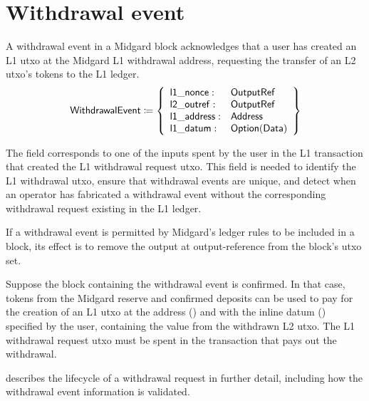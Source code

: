 \documentclass[../midgard.tex]{subfiles}
\begin{document}
\section{Withdrawal event}
\label{h:withdrawal-event}

A withdrawal event in a Midgard block acknowledges that a user has created an L1 utxo at the Midgard L1 withdrawal address, requesting the transfer of an L2 utxo's tokens to the L1 ledger.
\begin{equation*}
    \mathsf{WithdrawalEvent} \coloneq \left\{
    \begin{array}{ll}
        \mathsf{l1\_nonce} : & \mathsf{OutputRef} \\
        \mathsf{l2\_outref} :& \mathsf{OutputRef} \\
        \mathsf{l1\_address} : & \mathsf{Address} \\
        \mathsf{l1\_datum} : & \mathsf{Option(Data)}
    \end{array} \right\}
\end{equation*}

The  field corresponds to one of the inputs spent by the user in the L1 transaction that created the L1 withdrawal request utxo. This field is needed to identify the L1 withdrawal utxo, ensure that withdrawal events are unique, and detect when an operator has fabricated a withdrawal event without the corresponding withdrawal request existing in the L1 ledger.

If a withdrawal event is permitted by Midgard's ledger rules to be included in a block, its effect is to remove the output at output-reference  from the block's utxo set.

Suppose the block containing the withdrawal event is confirmed. In that case, tokens from the Midgard reserve and confirmed deposits can be used to pay for the creation of an L1 utxo at the address () and with the inline datum () specified by the user, containing the value from the withdrawn L2 utxo. The L1 withdrawal request utxo must be spent in the transaction that pays out the withdrawal.

 describes the lifecycle of a withdrawal request in further detail, including how the withdrawal event information is validated.
\end{document}
